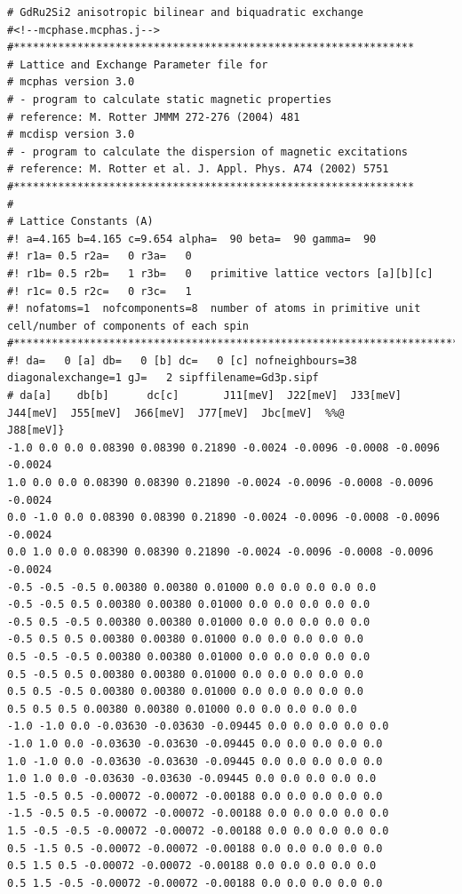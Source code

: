 {\footnotesize
\begin{verbatim}
# GdRu2Si2 anisotropic bilinear and biquadratic exchange 
#<!--mcphase.mcphas.j-->
#***************************************************************
# Lattice and Exchange Parameter file for
# mcphas version 3.0
# - program to calculate static magnetic properties
# reference: M. Rotter JMMM 272-276 (2004) 481
# mcdisp version 3.0
# - program to calculate the dispersion of magnetic excitations
# reference: M. Rotter et al. J. Appl. Phys. A74 (2002) 5751
#***************************************************************
#
# Lattice Constants (A)
#! a=4.165 b=4.165 c=9.654 alpha=  90 beta=  90 gamma=  90
#! r1a= 0.5 r2a=   0 r3a=   0
#! r1b= 0.5 r2b=   1 r3b=   0   primitive lattice vectors [a][b][c]
#! r1c= 0.5 r2c=   0 r3c=   1
#! nofatoms=1  nofcomponents=8  number of atoms in primitive unit cell/number of components of each spin
#****************************************************************************}
#! da=   0 [a] db=   0 [b] dc=   0 [c] nofneighbours=38 diagonalexchange=1 gJ=   2 sipffilename=Gd3p.sipf
# da[a]    db[b]      dc[c]       J11[meV]  J22[meV]  J33[meV]  J44[meV]  J55[meV]  J66[meV]  J77[meV]  Jbc[meV]  %%@
J88[meV]} 
-1.0 0.0 0.0 0.08390 0.08390 0.21890 -0.0024 -0.0096 -0.0008 -0.0096 -0.0024 
1.0 0.0 0.0 0.08390 0.08390 0.21890 -0.0024 -0.0096 -0.0008 -0.0096 -0.0024 
0.0 -1.0 0.0 0.08390 0.08390 0.21890 -0.0024 -0.0096 -0.0008 -0.0096 -0.0024 
0.0 1.0 0.0 0.08390 0.08390 0.21890 -0.0024 -0.0096 -0.0008 -0.0096 -0.0024 
-0.5 -0.5 -0.5 0.00380 0.00380 0.01000 0.0 0.0 0.0 0.0 0.0 
-0.5 -0.5 0.5 0.00380 0.00380 0.01000 0.0 0.0 0.0 0.0 0.0 
-0.5 0.5 -0.5 0.00380 0.00380 0.01000 0.0 0.0 0.0 0.0 0.0 
-0.5 0.5 0.5 0.00380 0.00380 0.01000 0.0 0.0 0.0 0.0 0.0 
0.5 -0.5 -0.5 0.00380 0.00380 0.01000 0.0 0.0 0.0 0.0 0.0 
0.5 -0.5 0.5 0.00380 0.00380 0.01000 0.0 0.0 0.0 0.0 0.0 
0.5 0.5 -0.5 0.00380 0.00380 0.01000 0.0 0.0 0.0 0.0 0.0 
0.5 0.5 0.5 0.00380 0.00380 0.01000 0.0 0.0 0.0 0.0 0.0 
-1.0 -1.0 0.0 -0.03630 -0.03630 -0.09445 0.0 0.0 0.0 0.0 0.0 
-1.0 1.0 0.0 -0.03630 -0.03630 -0.09445 0.0 0.0 0.0 0.0 0.0 
1.0 -1.0 0.0 -0.03630 -0.03630 -0.09445 0.0 0.0 0.0 0.0 0.0 
1.0 1.0 0.0 -0.03630 -0.03630 -0.09445 0.0 0.0 0.0 0.0 0.0 
1.5 -0.5 0.5 -0.00072 -0.00072 -0.00188 0.0 0.0 0.0 0.0 0.0 
-1.5 -0.5 0.5 -0.00072 -0.00072 -0.00188 0.0 0.0 0.0 0.0 0.0 
1.5 -0.5 -0.5 -0.00072 -0.00072 -0.00188 0.0 0.0 0.0 0.0 0.0 
0.5 -1.5 0.5 -0.00072 -0.00072 -0.00188 0.0 0.0 0.0 0.0 0.0 
0.5 1.5 0.5 -0.00072 -0.00072 -0.00188 0.0 0.0 0.0 0.0 0.0 
0.5 1.5 -0.5 -0.00072 -0.00072 -0.00188 0.0 0.0 0.0 0.0 0.0 

\end{verbatim}}
